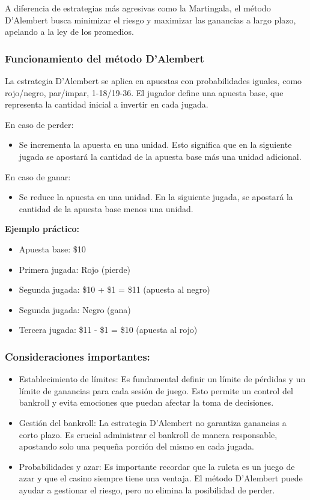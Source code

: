 \documentclass{article}
\begin{document}
A diferencia de estrategias más agresivas como la Martingala, el método D'Alembert busca minimizar el riesgo y maximizar las ganancias a largo plazo, apelando a la ley de los promedios.

\subsubsection{Funcionamiento del método D'Alembert}

La estrategia D'Alembert se aplica en apuestas con probabilidades iguales, como rojo/negro, par/impar, 1-18/19-36. El jugador define una apuesta base, que representa la cantidad inicial a invertir en cada jugada.

En caso de perder:

\begin{itemize}
    \item Se incrementa la apuesta en una unidad. Esto significa que en la siguiente jugada se apostará la cantidad de la apuesta base más una unidad adicional.
\end{itemize}

En caso de ganar:

\begin{itemize}
    \item Se reduce la apuesta en una unidad. En la siguiente jugada, se apostará la cantidad de la apuesta base menos una unidad.
\end{itemize}

\textbf{Ejemplo práctico:}

\begin{itemize}
    \item Apuesta base: \$10
    \item Primera jugada: Rojo (pierde)
    \item Segunda jugada: \$10 + \$1 = \$11 (apuesta al negro)
    \item Segunda jugada: Negro (gana)
    \item Tercera jugada: \$11 - \$1 = \$10 (apuesta al rojo)
\end{itemize}

\subsubsection{Consideraciones importantes:}

\begin{itemize}
    \item Establecimiento de límites: Es fundamental definir un límite de pérdidas y un límite de ganancias para cada sesión de juego. Esto permite un control del bankroll y evita emociones que puedan afectar la toma de decisiones.
    \item Gestión del bankroll: La estrategia D'Alembert no garantiza ganancias a corto plazo. Es crucial administrar el bankroll de manera responsable, apostando solo una pequeña porción del mismo en cada jugada.
    \item Probabilidades y azar: Es importante recordar que la ruleta es un juego de azar y que el casino siempre tiene una ventaja. El método D'Alembert puede ayudar a gestionar el riesgo, pero no elimina la posibilidad de perder.
\end{itemize}
\end{document}
